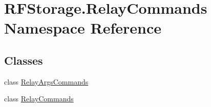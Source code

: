 \hypertarget{namespace_r_f_storage_1_1_relay_commands}{}\section{R\+F\+Storage.\+Relay\+Commands Namespace Reference}
\label{namespace_r_f_storage_1_1_relay_commands}
\subsection*{Classes}
\begin{DoxyCompactItemize}
\item 
class \mbox{\hyperlink{class_r_f_storage_1_1_relay_commands_1_1_relay_args_commands}{Relay\+Args\+Commands}}
\item 
class \mbox{\hyperlink{class_r_f_storage_1_1_relay_commands_1_1_relay_commands}{Relay\+Commands}}
\end{DoxyCompactItemize}
